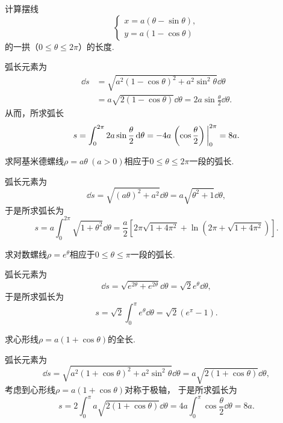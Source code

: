 \begin{example}
计算摆线\[
	\left\{ \begin{array}{l}
		x = a (\theta - \sin\theta), \\
		y = a (1 - \cos\theta)
	\end{array} \right.
\]的一拱（\(0 \leq \theta \leq 2\pi\)）的长度.
\begin{solution}
弧长元素为\begin{align*}
	\dd{s} &= \sqrt{a^2 (1 - \cos\theta)^2 + a^2 \sin^2\theta} \dd{\theta} \\
	&= a \sqrt{2 (1 - \cos\theta)} \dd{\theta}
	= 2 a \sin\frac\theta2 \dd{\theta}.
\end{align*}
从而，所求弧长\[
	s = \int_0^{2\pi} 2a \sin\frac\theta2 \dd{\theta}
	= -4a \eval{\left(\cos\frac\theta2\right)}_0^{2\pi}
	= 8a.
\]
\end{solution}
\end{example}

\begin{example}
求阿基米德螺线\(\rho=a\theta\ (a>0)\)相应于\(0\leq\theta\leq2\pi\)一段的弧长.
\begin{solution}
弧长元素为\[
	\dd{s} = \sqrt{(a\theta)^2 + a^2} \dd{\theta}
	= a\sqrt{\theta^2+1} \dd{\theta},
\]
于是所求弧长为\[
	s = a \int_0^{2\pi} \sqrt{1+\theta^2} \dd{\theta}
	= \frac{a}{2} \left[
	2\pi\sqrt{1+4\pi^2} + \ln(2\pi+\sqrt{1+4\pi^2})
	\right].
\]
\end{solution}
\end{example}

\begin{example}
求对数螺线\(\rho=e^{\theta}\)相应于\(0\leq\theta\leq\pi\)一段的弧长.
\begin{solution}
弧长元素为\[
	\dd{s} = \sqrt{e^{2\theta}+e^{2\theta}} \dd{\theta}
	= \sqrt{2}e^{\theta} \dd{\theta},
\]
于是所求弧长为\[
	s = \sqrt{2} \int_0^\pi e^{\theta} \dd{\theta}
	= \sqrt{2} (e^\pi-1).
\]
\end{solution}
\end{example}

\begin{example}
求心形线\(\rho=a(1+\cos\theta)\)的全长.
\begin{solution}
弧长元素为\[
	\dd{s} = \sqrt{a^2(1+\cos\theta)^2+a^2\sin^2\theta} \dd{\theta}
	= a \sqrt{2(1+\cos\theta)} \dd{\theta},
\]
考虑到心形线\(\rho=a(1+\cos\theta)\)对称于极轴，
于是所求弧长为\[
	s = 2 \int_0^\pi a \sqrt{2(1+\cos\theta)} \dd{\theta}
	= 4a \int_0^\pi \cos\frac\theta2 \dd{\theta}
	= 8a.
\]
\end{solution}
\end{example}
